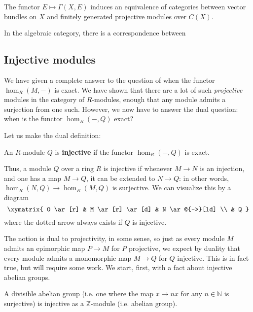 \begin{theorem}
The functor $E \mapsto \Gamma(X, E)$ induces an equivalence of categories
between vector bundles on $X$ and finitely generated projective modules over
$C(X)$.
\end{theorem} 

In the algebraic category, there is a correspondence between 
\subsection{Injective modules}
\label{ssecinj}

We have given a complete answer to the question of when the functor
$\hom_R(M,-)$ is exact. We have shown that there are a lot of such
\emph{projective} modules in the category of $R$-modules, enough that any
module admits a surjection from one such.
However, we now have to answer the dual question: when is the functor
$\hom_R(-, Q)$ exact?

Let us make the dual definition:

\begin{definition}
An $R$-module $Q$ is \textbf{injective} if the functor $\hom_R(-,Q)$ is exact.
\end{definition}


Thus, a module $Q$ over a ring $R$ is injective if
whenever $M \to N$ is an injection, and one has a map $M \to Q$, it can be
extended to $N \to Q$: in other words, $\hom_R(N,Q ) \to \hom_R(M,Q)$ is
surjective.
We can visualize this by a diagram
\[ \xymatrix{
0 \ar[r] &  M \ar[r] \ar[d]  &  N \ar@{-->}[ld] \\
& Q
}\]
where the dotted arrow always exists if $Q$ is injective.

The notion is dual to projectivity, in some sense, so just as every module $M$
admits an epimorphic map $P \to M$ for $P$ projective, we expect by duality
that every module admits a monomorphic map $M \to Q$ for $Q$ injective.
This is in fact true, but will require some work.
We start, first, with a fact about injective abelian groups.

\begin{theorem}\label{divisibleimpliesinj}
A divisible abelian group (i.e. one where the map $x
\to nx$ for any $n \in \mathbb{N}$ is surjective) is injective as  a
$\mathbb{Z}$-module (i.e. abelian group).
\end{theorem}

